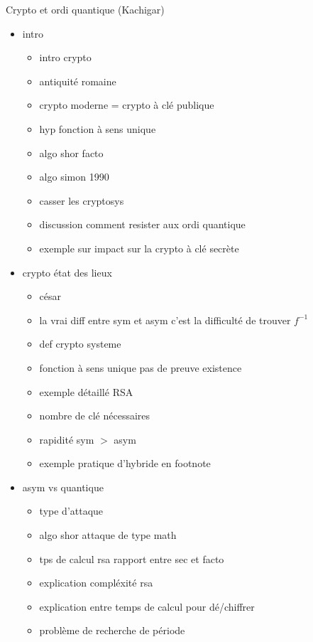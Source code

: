 Crypto et ordi quantique (Kachigar)
\begin{itemize}
    \item intro
        \begin{itemize}
            \item intro crypto
            \item antiquité romaine
            \item crypto moderne = crypto à clé publique
            \item hyp fonction à sens unique
            \item algo shor facto
            \item algo simon 1990
            \item casser les cryptosys
            \item discussion comment resister aux ordi quantique
            \item exemple sur impact sur la crypto à clé secrète
        \end{itemize}
    \item crypto état des lieux
        \begin{itemize}
            \item césar
            \item la vrai diff entre sym et asym c'est la difficulté de trouver $f^{-1}$
            \item def crypto systeme
            \item fonction à sens unique pas de preuve existence
            \item exemple détaillé RSA
            \item nombre de clé nécessaires
            \item rapidité sym $>$ asym
            \item exemple pratique d'hybride en footnote
        \end{itemize}
    \item asym vs quantique
        \begin{itemize}
            \item type d'attaque
            \item algo shor attaque de type math
            \item tps de calcul rsa rapport entre sec et facto
            \item explication compléxité rsa
            \item explication entre temps de calcul pour dé/chiffrer
            \item problème de recherche de période

\end{itemize}
\end{itemize}
